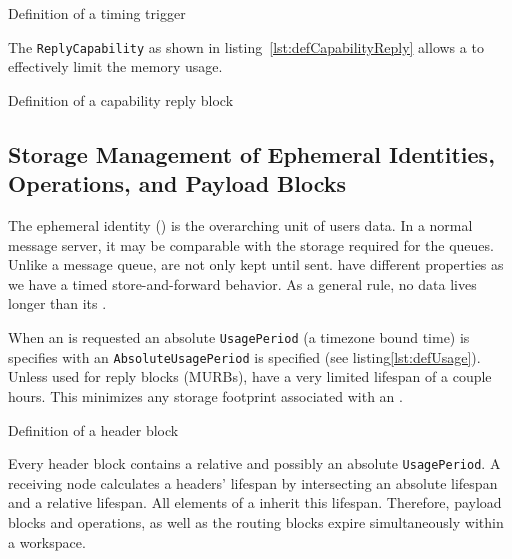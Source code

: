\begin{lstfloat}[ht]
	
	\caption{Definition of a timing trigger}
	\label{lst:defUsage}
\end{lstfloat}

The \texttt{ReplyCapability} as shown in listing~\ref{lst:defCapabilityReply} allows a \VortexNode{} to effectively limit the memory usage. 
\begin{lstfloat}[ht]
	
	\caption{Definition of a capability reply block}
	\label{lst:defCapabilityReply}
\end{lstfloat}


\subsection{Storage Management of Ephemeral Identities,  Operations, and Payload Blocks}
The ephemeral identity () is the overarching unit of users data. In a normal message server, it may be comparable with the storage required for the queues. Unlike a message queue, \VortexMessages{} are not only kept until sent. \VortexMessages{} have different properties as we have a timed store-and-forward behavior. As a general rule, no data lives longer than its .

When an  is requested an absolute \texttt{UsagePeriod} (a timezone bound time) is specifies with an \texttt{AbsoluteUsagePeriod} is specified (see listing\ref{lst:defUsage}). Unless used for reply blocks (MURBs),  have a very limited lifespan of a couple hours. This minimizes any storage footprint associated with an . 

\begin{lstfloat}[ht]
	
	\caption{Definition of a header block}
	\label{lst:defHeaderBlock}
\end{lstfloat}

Every header block contains a relative and possibly an absolute \texttt{UsagePeriod}. A receiving node calculates a headers' lifespan by intersecting an absolute lifespan and a relative lifespan. All elements of a \VortexMessage{} inherit this lifespan. Therefore, payload blocks and operations, as well as the routing blocks expire simultaneously within a workspace.


